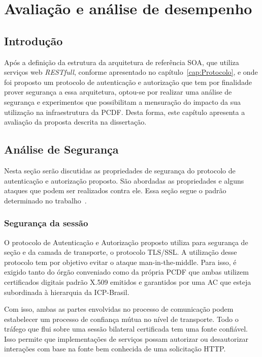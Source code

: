 \chapter{Avaliação e análise de desempenho}

\section{Introdução}

Após a definição da estrutura da arquitetura de referência SOA, que utiliza serviços web \emph{RESTfull}, conforme apresentado no capítulo~\ref{cap:Protocolo},  e onde foi proposto um protocolo de autenticação e autorização que tem por finalidade prover segurança a essa arquitetura, optou-se por realizar uma an\'{a}lise de seguran\c ca e experimentos que possibilitam a mensuração do impacto da sua utilização na infraestrutura da PCDF. Desta forma, este capítulo apresenta a avaliação da proposta descrita na disserta\c c\~{a}o.

\section{Análise de Segurança}

Nesta seção serão discutidas as propriedades de segurança do protocolo de autenticação e autorização proposto. São abordadas as propriedades e alguns ataques que podem ser realizados contra ele. Essa seção segue o padrão determinado no trabalho~\cite{traust08}.

\subsection{Segurança da sessão}

O protocolo de Autenticação e Autorização proposto utiliza para segurança de seção e da camada de transporte, o protocolo TLS/SSL. A utilização desse protocolo tem por objetivo evitar o ataque man-in-the-middle. Para isso, é exigido tanto do órgão conveniado como da própria PCDF que ambas utilizem certificados digitais padrão X.509 emitidos e garantidos por uma AC que esteja subordinada à hierarquia da ICP-Brasil.

Com isso, ambas as partes envolvidas no processo de comunicação podem estabelecer um processo de confiança mútua no nível de transporte. Todo o tráfego que flui sobre uma sessão bilateral certificada tem uma fonte confiável. Isso permite que implementações de serviços possam autorizar ou desautorizar interações com base na fonte bem conhecida de uma solicitação HTTP.

